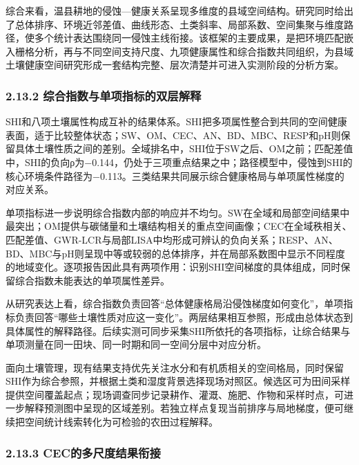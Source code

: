 \documentclass[
  11pt,
  a4paper,
]{ctexart}
\begin{document}
综合来看，温县耕地的侵蚀---健康关系呈现多维度的县域空间结构。研究同时给出了总体排序、环境近邻差值、曲线形态、土类斜率、局部系数、空间集聚与维度路径，使多个统计表达围绕同一侵蚀主线衔接。该框架的主要成果，是把环境匹配嵌入栅格分析，再与不同空间支持尺度、九项健康属性和综合指数共同组织，为县域土壤健康空间研究形成一套结构完整、层次清楚并可进入实测阶段的分析方案。

\hypertarget{ux7efcux5408ux6307ux6570ux4e0eux5355ux9879ux6307ux6807ux7684ux53ccux5c42ux89e3ux91ca}{%
\subsubsection{2.13.2
综合指数与单项指标的双层解释}\label{ux7efcux5408ux6307ux6570ux4e0eux5355ux9879ux6307ux6807ux7684ux53ccux5c42ux89e3ux91ca}}

SHI和八项土壤属性构成互补的结果体系。SHI把多项属性整合到共同的空间健康表面，适于比较整体状态；SW、OM、CEC、AN、BD、MBC、RESP和pH则保留具体土壤性质之间的差别。全域排名中，SHI位于SW之后、OM之前；匹配差值中，SHI的负向ρ为−0.144，仍处于三项重点结果之中；路径模型中，侵蚀到SHI的核心环境条件路径为−0.113。三类结果共同展示综合健康格局与单项属性梯度的对应关系。

单项指标进一步说明综合指数内部的响应并不均匀。SW在全域和局部空间结果中最突出；OM提供与碳储量和土壤结构相关的重点空间画像；CEC在全域秩相关、匹配差值、GWR-LCR与局部LISA中均形成可辨认的负向关系；RESP、AN、BD、MBC与pH则呈现中等或较弱的总体排序，并在局部系数图中显示不同程度的地域变化。逐项报告因此具有两项作用：识别SHI空间梯度的具体组成，同时保留综合指数未能表达的单项属性差异。

从研究表达上看，综合指数负责回答``总体健康格局沿侵蚀梯度如何变化''，单项指标负责回答``哪些土壤性质对应这一变化''。两层结果相互参照，形成由总体状态到具体属性的解释路径。后续实测可同步采集SHI所依托的各项指标，让综合结果与单项测量在同一田块、同一时期和同一空间分层中对应分析。

面向土壤管理，现有结果支持优先关注水分和有机质相关的空间格局，同时保留SHI作为综合参照，并根据土类和湿度背景选择现场对照区。候选区可为田间采样提供空间覆盖起点；现场调查同步记录耕作、灌溉、施肥、作物和采样时点，可进一步解释预测图中呈现的区域差别。若独立样点复现当前排序与局地梯度，便可继续把空间统计线索转化为可检验的农田过程解释。

\hypertarget{cecux7684ux591aux5c3aux5ea6ux7ed3ux679cux8854ux63a5}{%
\subsubsection{2.13.3
CEC的多尺度结果衔接}\label{cecux7684ux591aux5c3aux5ea6ux7ed3ux679cux8854ux63a5}}
\end{document}
